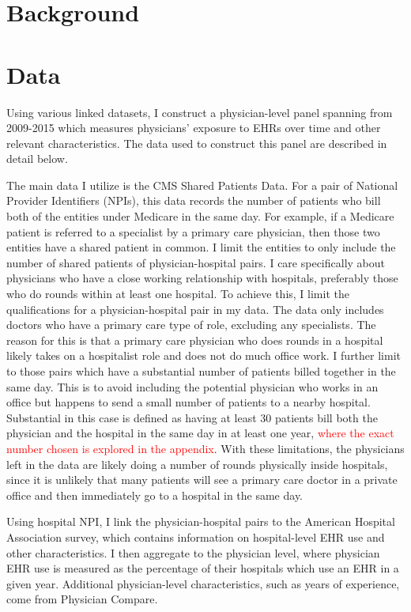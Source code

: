 \documentclass[11pt]{article}
\begin{document}
\section{Background}

\section{Data}

Using various linked datasets, I construct a physician-level panel spanning from 2009-2015 which measures physicians' exposure to EHRs over time and other relevant characteristics. The data used to construct this panel are described in detail below.

The main data I utilize is the CMS Shared Patients Data. For a pair of National Provider Identifiers (NPIs), this data records the number of patients who bill both of the entities under Medicare in the same day. For example, if a Medicare patient is referred to a specialist by a primary care physician, then those two entities have a shared patient in common. I limit the entities to only include the number of shared patients of physician-hospital pairs. I care specifically about physicians who have a close working relationship with hospitals, preferably those who do rounds within at least one hospital. To achieve this, I limit the qualifications for a physician-hospital pair in my data. The data only includes doctors who have a primary care type of role, excluding any specialists. The reason for this is that a primary care physician who does rounds in a hospital likely takes on a hospitalist role and does not do much office work. I further limit to those pairs which have a substantial number of patients billed together in the same day. This is to avoid including the potential physician who works in an office but happens to send a small number of patients to a nearby hospital. Substantial in this case is defined as having at least 30 patients bill both the physician and the hospital in the same day in at least one year, \textcolor{red}{where the exact number chosen is explored in the appendix}. With these limitations, the physicians left in the data are likely doing a number of rounds physically inside hospitals, since it is unlikely that many patients will see a primary care doctor in a private office and then immediately go to a hospital in the same day. 

Using hospital NPI, I link the physician-hospital pairs to the American Hospital Association survey, which contains information on hospital-level EHR use and other characteristics. I then aggregate to the physician level, where physician EHR use is measured as the percentage of their hospitals which use an EHR in a given year. Additional physician-level characteristics, such as years of experience, come from Physician Compare. 
\end{document}

